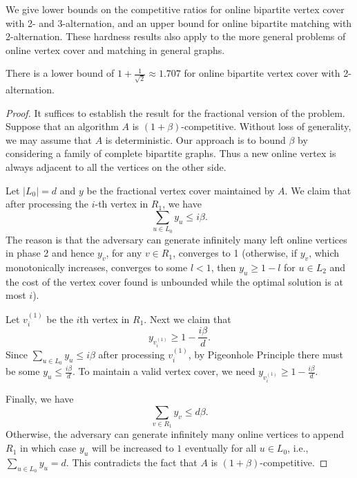 \documentclass{article}
\begin{document}
We give lower bounds on the competitive ratios for online bipartite vertex cover with 2- and 3-alternation, and an upper bound for online bipartite matching with 2-alternation. These hardness results also apply to the more general problems of online vertex cover and matching in general graphs.
\begin{proposition}
There is a lower bound of $1+\frac{1}{\sqrt{2}}\approx 1.707$
for online bipartite vertex cover with 2-alternation.
\end{proposition}
\begin{proof}
It suffices to establish the result for the fractional version of the problem. Suppose that an algorithm $A$ is $(1+\beta)$-competitive. 
Without loss of generality, we may assume that $A$ is deterministic.
Our approach is to bound $\beta$ by considering a family of complete bipartite graphs. Thus a new online vertex is always adjacent to all the vertices on the other side.

Let $|L_0|=d$ and $y$ be the fractional vertex cover maintained by $A$. 
We claim that after processing the $i$-th vertex in $R_1$, we have
$$\sum_{u\in L_0} y_u\leq i\beta.$$ 
The reason is that the adversary can generate infinitely many left online vertices in phase 2 and hence $y_v$, for any $v\in R_1$, converges to 1 (otherwise, if $y_v$, which monotonically increases, converges to some $l<1$, then $y_u\geq 1-l$ for $u\in L_2$ and the cost of the vertex cover found is unbounded while the optimal solution is at most $i$).


Let $v_i^{(1)}$ be the $i$th vertex in $R_1$. Next we claim that $$y_{v_{i}^{(1)}}\geq 1-\frac{i\beta}{d}.$$ Since $\sum_{u\in L_0} y_u\leq i\beta$ after processing $v_{i}^{(1)}$, by Pigeonhole Principle there must be some $y_u\leq \frac{i\beta}{d}$. To maintain a valid vertex cover, we need $y_{v_{i}^{(1)}}\geq 1-\frac{i\beta}{d}$.

Finally, we have 
\begin{equation}
\label{[eqn:yv]}
\sum_{v\in R_1} y_v\leq d\beta.
\end{equation}
Otherwise, the adversary can generate infinitely many online vertices to append $R_1$ in which case 
$y_u$ will be increased to $1$ eventually for all $u\in L_0$, i.e., $\sum_{u\in L_0}y_u = d$.
This contradicts the fact that $A$ is $(1+\beta)$-competitive.


\end{proof}
\end{document}
